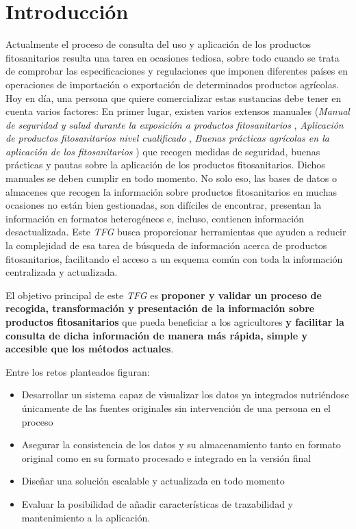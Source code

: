 \chapter{Introducción} \label{introduccion}
Actualmente el proceso de consulta del uso y aplicación de los productos fitosanitarios resulta una tarea en ocasiones tediosa, sobre todo cuando se trata de comprobar las especificaciones y regulaciones que imponen diferentes países en operaciones de importación o exportación de determinados productos agrícolas. Hoy en día, una persona que quiere comercializar estas sustancias debe tener en cuenta varios factores: En primer lugar, existen varios extensos manuales (\textit{Manual de seguridad y salud durante la exposición a productos fitosanitarios} \cite{manualseguridad}, \textit{Aplicación de productos fitosanitarios nivel cualificado} \cite{aplicacionfitosanitarios}, \textit{Buenas prácticas agrícolas en la aplicación de los fitosanitarios} \cite{buenaspracticas}) que recogen medidas de seguridad, buenas prácticas y pautas sobre la aplicación de los productos fitosanitarios. Dichos manuales se deben cumplir en todo momento. No solo eso, las bases de datos o almacenes que recogen la información sobre productos fitosanitarios en muchas ocasiones no están bien gestionadas, son difíciles de encontrar, presentan la información en formatos heterogéneos e, incluso, contienen información desactualizada. Este \textit{TFG} busca proporcionar herramientas que ayuden a reducir la complejidad de esa tarea de búsqueda de información acerca de productos fitosanitarios, facilitando el acceso a un esquema común con toda la información centralizada y actualizada.\par

El objetivo principal de este \textit{TFG} es \textbf{proponer y validar un proceso de recogida, transformación y presentación de la información sobre productos fitosanitarios} que pueda beneficiar a los agricultores \textbf{y facilitar la consulta de dicha información de manera más rápida, simple y accesible que los métodos actuales}. \par
Entre los retos planteados figuran:
\begin{itemize}
\item Desarrollar un sistema capaz de visualizar los datos ya integrados nutriéndose únicamente de las fuentes originales sin intervención de una persona en el proceso
\item Asegurar la consistencia de los datos y su almacenamiento tanto en formato original como en su formato procesado e integrado en la versión final
\item Diseñar una solución escalable y actualizada en todo momento
\item Evaluar la posibilidad de añadir características de trazabilidad y mantenimiento a la aplicación.
\end{itemize}

